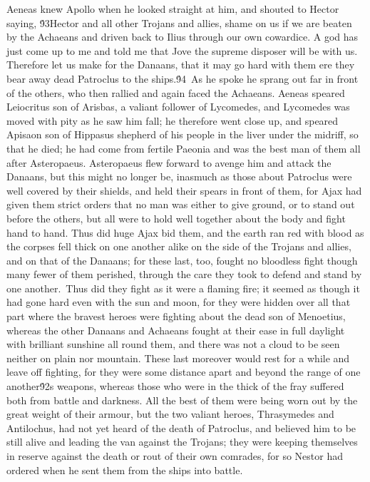 {Aeneas knew Apollo when he looked straight at him, and shouted to Hector saying, \'93Hector and all other Trojans and allies, shame on us if we are beaten by the Achaeans and driven back to Ilius through our own cowardice. A god has just come up to me and told me that Jove the supreme disposer will be with us. Therefore let us make for the Danaans, that it may go hard with them ere they bear away dead Patroclus to the ships.\'94\
As he spoke he sprang out far in front of the others, who then rallied and again faced the Achaeans. Aeneas speared Leiocritus son of Arisbas, a valiant follower of Lycomedes, and Lycomedes was moved with pity as he saw him fall; he therefore went close up, and speared Apisaon son of Hippasus shepherd of his people in the liver under the midriff, so that he died; he had come from fertile Paeonia and was the best man of them all after Asteropaeus. Asteropaeus flew forward to avenge him and attack the Danaans, but this might no longer be, inasmuch as those about Patroclus were well covered by their shields, and held their spears in front of them, for Ajax had given them strict orders that no man was either to give ground, or to stand out before the others, but all were to hold well together about the body and fight hand to hand. Thus did huge Ajax bid them, and the earth ran red with blood as the corpses fell thick on one another alike on the side of the Trojans and allies, and on that of the Danaans; for these last, too, fought no bloodless fight though many fewer of them perished, through the care they took to defend and stand by one another.\
Thus did they fight as it were a flaming fire; it seemed as though it had gone hard even with the sun and moon, for they were hidden over all that part where the bravest heroes were fighting about the dead son of Menoetius, whereas the other Danaans and Achaeans fought at their ease in full daylight with brilliant sunshine all round them, and there was not a cloud to be seen neither on plain nor mountain. These last moreover would rest for a while and leave off fighting, for they were some distance apart and beyond the range of one another\'92s weapons, whereas those who were in the thick of the fray suffered both from battle and darkness. All the best of them were being worn out by the great weight of their armour, but the two valiant heroes, Thrasymedes and Antilochus, had not yet heard of the death of Patroclus, and believed him to be still alive and leading the van against the Trojans; they were keeping themselves in reserve against the death or rout of their own comrades, for so Nestor had ordered when he sent them from the ships into battle.\
}
